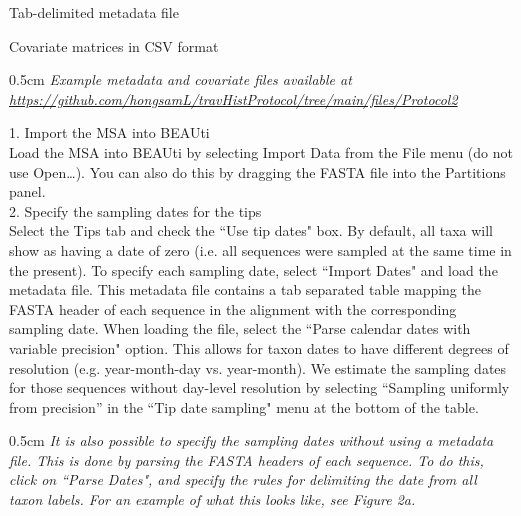 \documentclass{article}
\newcommand{\ann}[1]{
\begin{adjustwidth}{0.5cm}{}
\it{#1}\\
\end{adjustwidth}}
\begin{document}
\hspace{0.5cm}Tab-delimited metadata file

\hspace{0.5cm}Covariate matrices in CSV format\\

\ann{Example metadata and covariate files available at\\
{\upshape\url{https://github.com/hongsamL/travHistProtocol/tree/main/files/Protocol2}}}

1. Import the MSA into BEAUti\\

Load the MSA into BEAUti by selecting Import Data from the File menu (do not use Open\ldots). You can also do this by dragging the FASTA file into the Partitions panel.\\

2. Specify the sampling dates for the tips\\

Select the Tips tab and check the ``Use tip dates" box. By default, all taxa will show as having a date of zero (i.e. all sequences were sampled at the same time in the present).
To specify each sampling date, select ``Import Dates" and load the metadata file. This metadata file contains a tab separated table mapping the FASTA header of each sequence in the alignment with the corresponding sampling date. When loading the file, select the ``Parse calendar dates with variable precision" option.
This allows for taxon dates to have different degrees of resolution (e.g. year-month-day vs. year-month). We estimate the sampling dates for those sequences without day-level resolution by selecting ``Sampling uniformly from precision'' in the ``Tip date sampling" menu at the bottom of the table. \\ %

\ann{It is also possible to specify the sampling dates without using a metadata file. This is done by parsing the FASTA headers of each sequence. To do this, click on ``Parse Dates", and specify the rules for delimiting the date from all taxon labels. For an example of what this looks like, see \cite{skyprot} Figure 2a.}
\end{document}
